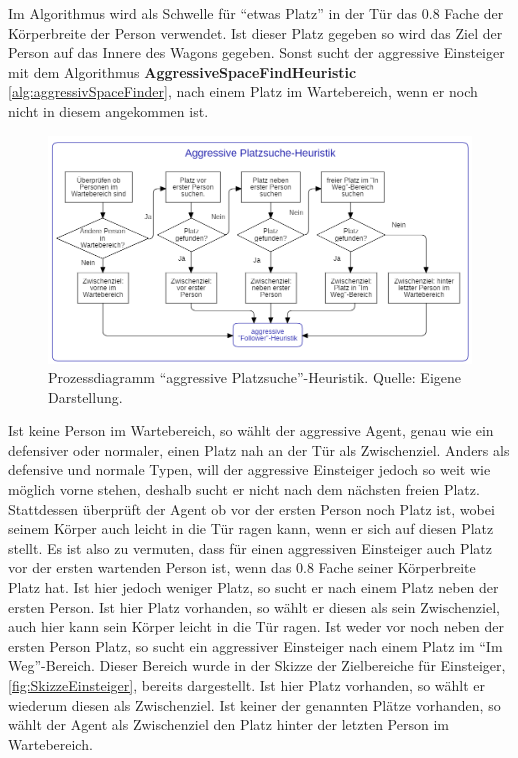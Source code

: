 Im Algorithmus wird als Schwelle für "`etwas Platz"' in der Tür das 0.8 Fache der Körperbreite der Person verwendet. Ist dieser Platz gegeben so wird das Ziel der Person auf das Innere des Wagons gegeben. Sonst sucht der aggressive Einsteiger mit dem Algorithmus \textbf{AggressiveSpaceFindHeuristic} \ref{alg:aggressivSpaceFinder}, nach einem Platz im Wartebereich, wenn er noch nicht in diesem angekommen ist.

\begin{figure}[H]
	\centering
		\includegraphics[width=1.0\textwidth]{pictures/model/algorithm/boarding/aggressive_boarding/aggressive_space_find_heuristic.png}
	\caption{Prozessdiagramm "`aggressive Platzsuche"'-Heuristik. Quelle: Eigene Darstellung.}
	\label{fig:APH}
\end{figure}
Ist keine Person im Wartebereich, so wählt der aggressive Agent, genau wie ein defensiver oder normaler, einen Platz nah an der Tür als Zwischenziel. Anders als defensive und normale Typen, will der aggressive Einsteiger jedoch so weit wie möglich vorne stehen, deshalb sucht er nicht nach dem nächsten freien Platz. Stattdessen überprüft der Agent ob vor der ersten Person noch Platz ist, wobei seinem Körper auch leicht in die Tür ragen kann, wenn er sich auf diesen Platz stellt. Es ist also zu vermuten, dass für einen aggressiven Einsteiger auch Platz vor der ersten wartenden Person ist, wenn das 0.8 Fache seiner Körperbreite Platz hat. Ist hier jedoch weniger Platz, so sucht er nach einem Platz neben der ersten Person. Ist hier Platz vorhanden, so wählt er diesen als sein Zwischenziel, auch hier kann sein Körper leicht in die Tür ragen. Ist weder vor noch neben der ersten Person Platz, so sucht ein aggressiver Einsteiger nach einem Platz im "`Im Weg"'-Bereich. Dieser Bereich wurde in der Skizze der Zielbereiche für Einsteiger, \figurename \ref{fig:SkizzeEinsteiger}, bereits dargestellt. Ist hier Platz vorhanden, so wählt er wiederum diesen als Zwischenziel. Ist keiner der genannten Plätze vorhanden, so wählt der Agent als Zwischenziel den Platz hinter der letzten Person im Wartebereich. 
